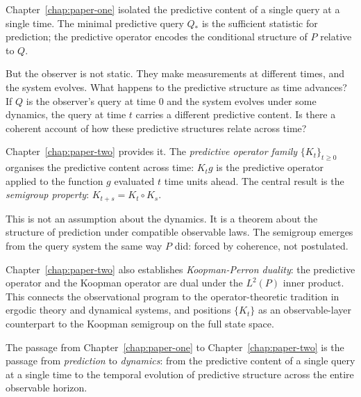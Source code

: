 
Chapter~\ref{chap:paper-one} isolated the predictive content of a
single query at a single time.  The minimal predictive query $Q_*$
is the sufficient statistic for prediction; the predictive operator
encodes the conditional structure of $P$ relative to $Q$.

But the observer is not static.  They make measurements at different
times, and the system evolves.  What happens to the predictive
structure as time advances?  If $Q$ is the observer's query at time
$0$ and the system evolves under some dynamics, the query at time $t$
carries a different predictive content.  Is there a coherent account
of how these predictive structures relate across time?

\medskip

Chapter~\ref{chap:paper-two} provides it.  The \emph{predictive
operator family} $\{K_t\}_{t \geq 0}$ organises the predictive
content across time: $K_t g$ is the predictive operator applied to
the function $g$ evaluated $t$ time units ahead.  The central result
is the \emph{semigroup property}: $K_{t+s} = K_t \circ K_s$.

This is not an assumption about the dynamics.  It is a theorem about
the structure of prediction under compatible observable laws.  The
semigroup emerges from the query system the same way $P$ did: forced
by coherence, not postulated.

Chapter~\ref{chap:paper-two} also establishes \emph{Koopman-Perron
duality}: the predictive operator and the Koopman operator are dual
under the $L^2(P)$ inner product.  This connects the observational
program to the operator-theoretic tradition in ergodic theory and
dynamical systems, and positions $\{K_t\}$ as an observable-layer
counterpart to the Koopman semigroup on the full state space.

\medskip

The passage from Chapter~\ref{chap:paper-one} to
Chapter~\ref{chap:paper-two} is the passage from \emph{prediction}
to \emph{dynamics}: from the predictive content of a single query at
a single time to the temporal evolution of predictive structure across
the entire observable horizon.
